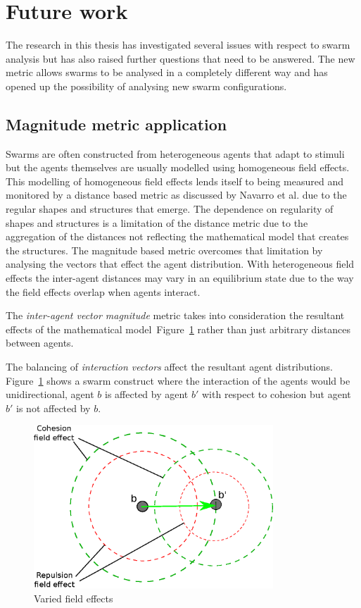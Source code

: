 \section{Future work}\label{additional:MoreWork}
The research in this thesis has investigated several issues with respect to swarm analysis but has also raised further questions that need to be answered. The new metric allows swarms to be analysed in a completely different way and has opened up the possibility of analysing new swarm configurations.

\subsection{Magnitude metric application}\label{additional:fieldsWork}
Swarms are often constructed from heterogeneous agents that adapt to stimuli but the agents themselves are usually modelled using homogeneous field effects. This modelling of homogeneous field effects lends itself to being measured and monitored by a distance based metric as discussed by Navarro et al. \cite{NIM:09} due to the regular shapes and structures that emerge. The dependence on regularity of shapes and structures is a limitation of the distance metric due to the aggregation of the distances not reflecting the mathematical model that creates the structures. The magnitude based metric overcomes that limitation by analysing the vectors that effect the agent distribution. With heterogeneous field effects the inter-agent distances may vary in an equilibrium state due to the way the field effects overlap when agents interact. 

The \textit{inter-agent vector magnitude} metric takes into consideration the resultant effects of the mathematical model~Figure~\ref{additional:FieldEffects} rather than just arbitrary distances between agents. 

The balancing of \textit{interaction vectors} affect the resultant agent distributions. Figure~\ref{additional:FieldEffects} shows a swarm construct where the interaction of the agents would be unidirectional, agent $b$ is affected by agent $b'$ with respect to cohesion but agent $b'$ is not affected by $b$. 

\begin{figure}[H]
\begin{center}
\includegraphics[width=9cm]{CHAPTER-9/figures/FieldEffects}
\end{center}
\caption{Varied field effects\label{additional:FieldEffects}}
\end{figure}


